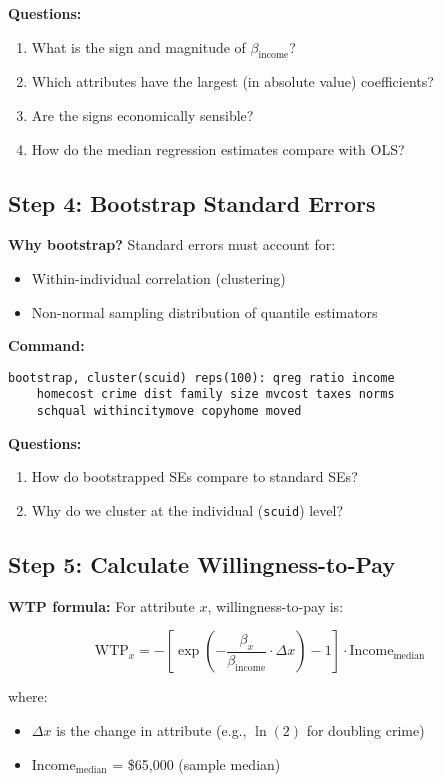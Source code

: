 \documentclass[12pt]{article}
\begin{document}
\textbf{Questions:}
\begin{enumerate}
    \item What is the sign and magnitude of $\beta_{\text{income}}$?
    \item Which attributes have the largest (in absolute value) coefficients?
    \item Are the signs economically sensible?
    \item How do the median regression estimates compare with OLS?
\end{enumerate}

\subsection{Step 4: Bootstrap Standard Errors}

\textbf{Why bootstrap?} Standard errors must account for:
\begin{itemize}
    \item Within-individual correlation (clustering)
    \item Non-normal sampling distribution of quantile estimators
\end{itemize}

\textbf{Command:}
\begin{verbatim}
bootstrap, cluster(scuid) reps(100): qreg ratio income 
    homecost crime dist family size mvcost taxes norms 
    schqual withincitymove copyhome moved
\end{verbatim}

\textbf{Questions:}
\begin{enumerate}
    \item How do bootstrapped SEs compare to standard SEs?
    \item Why do we cluster at the individual (\texttt{scuid}) level?
\end{enumerate}

\subsection{Step 5: Calculate Willingness-to-Pay}

\textbf{WTP formula:} For attribute $x$, willingness-to-pay is:

$$\text{WTP}_x = -\left[\exp\left(-\frac{\beta_x}{\beta_{\text{income}}} \cdot \Delta x\right) - 1\right] \cdot \text{Income}_{\text{median}}$$

where:
\begin{itemize}
    \item $\Delta x$ is the change in attribute (e.g., $\ln(2)$ for doubling crime)
    \item Income$_{\text{median}}$ = \$65,000 (sample median)
\end{itemize}
\end{document}
